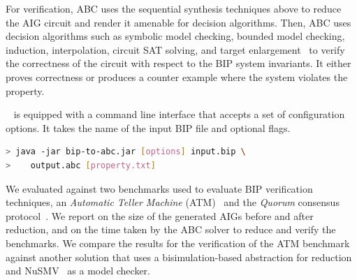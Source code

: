

For verification, 
ABC uses the sequential synthesis techniques above to reduce the 
AIG circuit and render it amenable for decision algorithms. 
Then, ABC uses decision algorithms such as 
symbolic model checking, bounded model checking, induction, 
interpolation, circuit SAT solving, 
and target enlargement~\cite{MoGS00,MoMZ01,HoSH00,BaKuAb02,Hari05expert}
to verify the correctness of the circuit with respect to the BIP system invariants. 
It either proves correctness or produces a counter example where the system violates the property. 




\biptool~ is equipped with a command line interface that accepts a set 
of configuration options. 
It takes the name of the input BIP file and optional flags. 
\begin{lstlisting}[language=Bash]
> java -jar bip-to-abc.jar [options] input.bip \
>    output.abc [property.txt]
\end{lstlisting}

We evaluated \biptool{} against two benchmarks used to evaluate BIP verification techniques, 
an {\em Automatic Teller Machine} (ATM)~\cite{atm} and the {\em Quorum} consensus
protocol~\cite{guerraoui2012speculative}. We report on the size of the generated
AIGs before and after reduction, and on the time taken by the ABC solver to 
reduce and verify the benchmarks. We compare the results for the 
verification of the ATM benchmark against another solution that uses a bisimulation-based abstraction for reduction \cite{facs14} and NuSMV~\cite{nusmv} as a model checker. 
%
